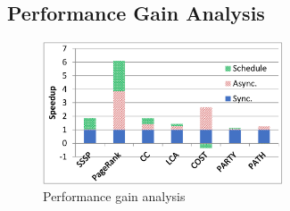 \subsection{Performance Gain Analysis}
\label{sec:expr:optimizations}

\begin{figure}[!t]
	\vspace{0.1in}
	\centering
	\includegraphics[width=2.8in]{fig/single-optimize}
	\caption{Performance gain analysis}
	\label{fig:single-optimize}
	\vspace{-0.1in}
\end{figure}

